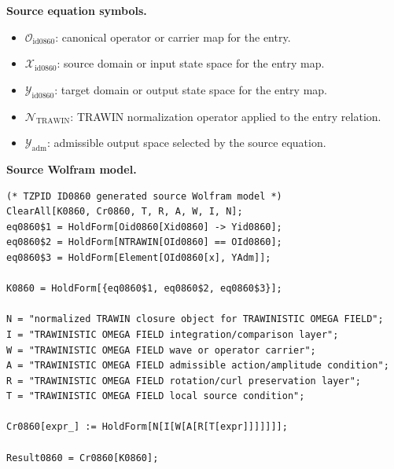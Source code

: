 \begin{minipage}[t]{0.49\linewidth}
\begingroup
\small
\raggedright
\textbf{Source equation symbols.}\par
\begin{itemize}[leftmargin=1.35em,itemsep=1pt,topsep=1pt,parsep=0pt]
    \item $\mathcal{O}_{\mathrm{id0860}}$: canonical operator or carrier map for the entry.
    \item $\mathcal{X}_{\mathrm{id0860}}$: source domain or input state space for the entry map.
    \item $\mathcal{Y}_{\mathrm{id0860}}$: target domain or output state space for the entry map.
    \item $\mathcal{N}_{\mathrm{TRAWIN}}$: TRAWIN normalization operator applied to the entry relation.
    \item $\mathcal{Y}_{\mathrm{adm}}$: admissible output space selected by the source equation.
\end{itemize}
\endgroup
\end{minipage}\hfill
\begin{minipage}[t]{0.47\linewidth}
\begingroup
\scriptsize
\raggedright
\textbf{Source Wolfram model.}\par
\begin{Verbatim}[fontsize=\tiny,breaklines=true,breakanywhere=true]
(* TZPID ID0860 generated source Wolfram model *)
ClearAll[K0860, Cr0860, T, R, A, W, I, N];
eq0860$1 = HoldForm[Oid0860[Xid0860] -> Yid0860];
eq0860$2 = HoldForm[NTRAWIN[OId0860] == OId0860];
eq0860$3 = HoldForm[Element[OId0860[x], YAdm]];

K0860 = HoldForm[{eq0860$1, eq0860$2, eq0860$3}];

N = "normalized TRAWIN closure object for TRAWINISTIC OMEGA FIELD";
I = "TRAWINISTIC OMEGA FIELD integration/comparison layer";
W = "TRAWINISTIC OMEGA FIELD wave or operator carrier";
A = "TRAWINISTIC OMEGA FIELD admissible action/amplitude condition";
R = "TRAWINISTIC OMEGA FIELD rotation/curl preservation layer";
T = "TRAWINISTIC OMEGA FIELD local source condition";

Cr0860[expr_] := HoldForm[N[I[W[A[R[T[expr]]]]]]];

Result0860 = Cr0860[K0860];
\end{Verbatim}
\endgroup
\end{minipage}

